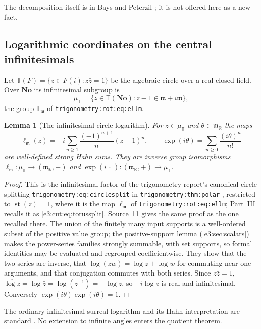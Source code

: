 \documentclass[11pt,letterpaper]{article}
\numberwithin{equation}{section}
\newtheorem{lemma}[lemma]{Lemma}
\theoremstyle{definition}
\theoremstyle{remark}
\newcommand{\No}{\mathbf{No}}
\newcommand{\R}{\mathbb R}
\newcommand{\TT}{\mathbb T}
\newcommand{\mm}{\mathfrak m}
\newcommand{\st}{\operatorname{st}}
\begin{document}
The decomposition itself is in Bays and Peterzil \cite[Section~5]{BP}; it is not
offered here as a new fact.

\subsection{Logarithmic coordinates on the central infinitesimals}

Let $\TT(F)=\{z\in F(i):z\bar z=1\}$ be the algebraic circle over a real closed
field. Over $\No$ its infinitesimal subgroup is
\[
 \mu_{\TT}=\{z\in\TT(\No):z-1\in\mm+i\mm\},
\]
the group $\TT_{\mm}$ of \texttt{trigonometry:rot:eq:ellm}.

\begin{lemma}[The infinitesimal circle logarithm]\label{e3:cpt:lem:circlelog}
For $z\in\mu_{\TT}$ and $\theta\in\mm_{\R}$ the maps
\[
 \ell_{\mm}(z)=-i\sum_{n\ge1}\frac{(-1)^{n+1}}n(z-1)^n,
 \qquad \exp(i\theta)=\sum_{n\ge0}\frac{(i\theta)^n}{n!}
\]
are well-defined strong Hahn sums. They are inverse group isomorphisms
$\ell_{\mm}:\mu_{\TT}\to(\mm_{\R},+)$ and
$\exp(i\,\cdot\,):(\mm_{\R},+)\to\mu_{\TT}$.
\end{lemma}
\begin{proof}
This is the infinitesimal factor of the trigonometry report's canonical circle
splitting \texttt{trigonometry:eq:circlesplit} in
\texttt{trigonometry:thm:polar} \cite{RepoTrig}, restricted to $\st(z)=1$, where
it is the map $\ell_{\mm}$ of \texttt{trigonometry:rot:eq:ellm}; Part~III
recalls it as \cref{e3:cut:eq:torussplit}. Source~11 gives the same proof as the
one recalled there. The union of the finitely many input supports is a
well-ordered subset of the positive value group; the positive-support lemma
(\cref{e3:sec:scalars}) makes the power-series families strongly summable, with
set supports, so formal identities may be evaluated and regrouped
coefficientwise. They show that the two series are inverse, that
$\log(zw)=\log z+\log w$ for commuting near-one arguments, and that conjugation
commutes with both series. Since $z\bar z=1$,
$\overline{\log z}=\log\bar z=\log(z^{-1})=-\log z$, so $-i\log z$ is real and
infinitesimal. Conversely $\exp(i\theta)\overline{\exp(i\theta)}=1$.
\end{proof}

The ordinary infinitesimal surreal logarithm and its Hahn interpretation are
standard \cite{BG,Gonshor}. No extension to infinite angles enters the quotient
theorem.
\end{document}
